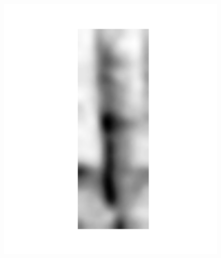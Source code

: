 \documentclass[t, xcolor={dvipsnames}]{beamer}
\begin{document}
\begin{frame}[fragile]
    \begin{figure}[!tbp]
      \centering
      \begin{minipage}[c]{0.3\textwidth}
        \includegraphics[width=\textwidth]{img/selected-feature}
      \end{minipage}
      \hfill
      \begin{minipage}[c]{0.3\textwidth}

\end{minipage}
\end{figure}
\end{frame}
\end{document}
